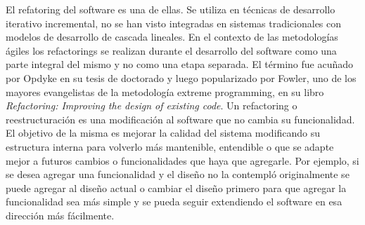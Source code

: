 El refatoring del software es una de ellas. Se utiliza en técnicas de desarrollo iterativo
incremental, no se han visto integradas en sistemas tradicionales con modelos de desarrollo de cascada lineales.
En el contexto de las metodologías ágiles los refactorings se realizan durante el desarrollo del
software como una parte integral del mismo y no como una etapa separada. El término fue acuñado por
Opdyke en su tesis de doctorado y luego popularizado por Fowler, uno de los mayores evangelistas de
la metodología extreme programming, en su libro \textit{Refactoring: Improving the design of existing code}.
Un refactoring o reestructuración es una modificación al software que no cambia su funcionalidad. El objetivo
de la misma es mejorar la calidad del sistema modificando su estructura interna para volverlo más mantenible,
entendible o que se adapte mejor a futuros cambios o funcionalidades que haya que agregarle. Por
ejemplo, si se desea agregar una funcionalidad y el diseño no la contempló originalmente se puede
agregar al diseño actual o cambiar el diseño primero para que agregar la funcionalidad sea más
simple y se pueda seguir extendiendo el software en esa dirección más fácilmente.

